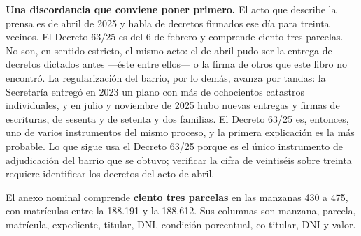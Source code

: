 \begin{cautela}
\textbf{Una discordancia que conviene poner primero.} El acto que describe la prensa es de abril de 2025 y habla de decretos firmados ese día para treinta vecinos. El Decreto 63/25 es del 6 de febrero y comprende ciento tres parcelas. No son, en sentido estricto, el mismo acto: el de abril pudo ser la entrega de decretos dictados antes ---éste entre ellos--- o la firma de otros que este libro no encontró. La regularización del barrio, por lo demás, avanza por tandas: la Secretaría entregó en 2023 un plano con más de ochocientos catastros individuales, y en julio y noviembre de 2025 hubo nuevas entregas y firmas de escrituras, de sesenta y de setenta y dos familias. El Decreto 63/25 es, entonces, uno de varios instrumentos del mismo proceso, y la primera explicación es la más probable. Lo que sigue usa el Decreto 63/25 porque es el único instrumento de adjudicación del barrio que se obtuvo; verificar la cifra de veintiséis sobre treinta requiere identificar los decretos del acto de abril.
\end{cautela}

El anexo nominal comprende \textbf{ciento tres parcelas} en las manzanas 430 a 475, con matrículas entre la 188.191 y la 188.612. Sus columnas son manzana, parcela, matrícula, expediente, titular, DNI, condición porcentual, co-titular, DNI y valor.

